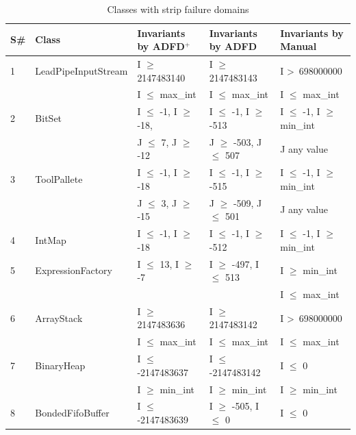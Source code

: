 \clearpage
\newpage
{\scriptsize
\begin{longtable}{|l|l|l|l|l|}
\caption{Classes with strip failure domains}\\
\hline
S\#  & Class						& Invariants by ADFD$^+$       		& Invariants by ADFD     			& Invariants by Manual	\\
  \hline
  \endhead
1	&LeadPipeInputStream 		& I $\ge$ 2147483140			& I $\ge$ 2147483143			& I \textgreater~698000000					\\ 
	&                                             & I $\le$ max\_int			  		& I $\le$ max\_int					& I $\le$ max\_int				\\
2	& BitSet				  		& I $\le$ -1, I $\ge$ -18,			& I $\le$ -1, I $\ge$ -513			& I $\le$ -1, I $\ge$ min\_int	\\ 
	&                                             & J $\le$ 7, J $\ge$ -12  			& J $\ge$ -503, J $\le$ 507		& J any value									\\ %
3	& ToolPallete			  		& I $\le$ -1, I $\ge$ -18			& I $\le$ -1, I $\ge$ -515			& I $\le$ -1, I $\ge$ min\_int	\\ 
	&                                             & J $\le$ 3, J $\ge$ -15			& J $\ge$ -509, J $\le$ 501		& J any value			   						\\
4	& IntMap			  		& I $\le$ -1, I $\ge$ -18			& I $\le$ -1, I $\ge$ -512			& I $\le$ -1, I $\ge$ min\_int	\\
5	& ExpressionFactory	  		& I $\le$ 13, I $\ge$ -7			& I $\ge$ -497, I $\le$ 513		& I $\ge$ min\_int 				\\ %
	&                                             & 								&								& I $\le$ max\_int					\\
6	& ArrayStack					& I $\ge$ 2147483636			& I $\ge$ 2147483142			& I \textgreater~698000000 					\\ 
	&                                             & I $\le$ max\_int		 			& I $\le$ max\_int					& I $\le$ max\_int 					\\
7	& BinaryHeap				& I $\le$ -2147483637			& I $\le$ -2147483142			& I $\le$ 0								 \\	
	&                                             & I $\ge$ min\_int					& I $\ge$ min\_int				& I $\ge$ min\_int				\\
8	& BondedFifoBuffer			& I $\le$ -2147483639 			& I $\ge$ -505, I $\le$ 0			& I $\le$ 0 								\\

\end{longtable}}
